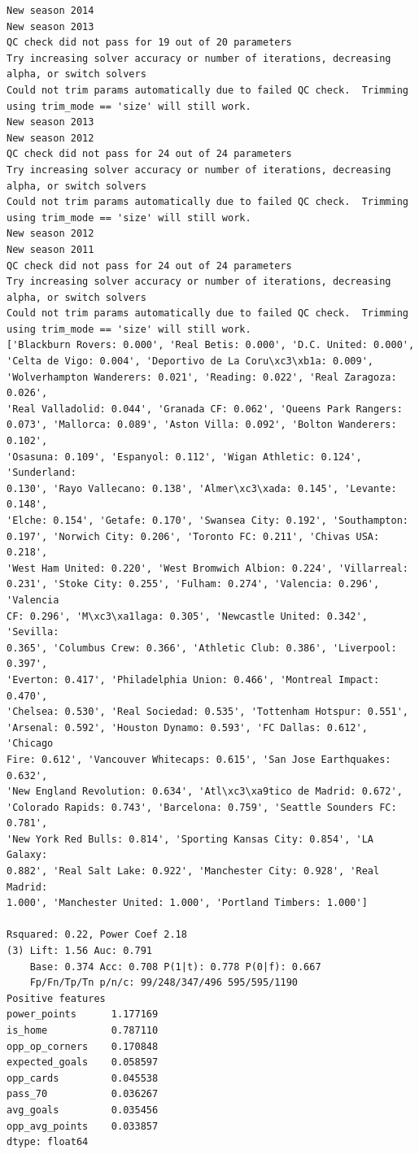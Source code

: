 \documentclass[12pt,fleqn]{article}\usepackage{common}
\begin{document}
\begin{verbatim}
New season 2014
New season 2013
QC check did not pass for 19 out of 20 parameters
Try increasing solver accuracy or number of iterations, decreasing alpha, or switch solvers
Could not trim params automatically due to failed QC check.  Trimming using trim_mode == 'size' will still work.
New season 2013
New season 2012
QC check did not pass for 24 out of 24 parameters
Try increasing solver accuracy or number of iterations, decreasing alpha, or switch solvers
Could not trim params automatically due to failed QC check.  Trimming using trim_mode == 'size' will still work.
New season 2012
New season 2011
QC check did not pass for 24 out of 24 parameters
Try increasing solver accuracy or number of iterations, decreasing alpha, or switch solvers
Could not trim params automatically due to failed QC check.  Trimming using trim_mode == 'size' will still work.
['Blackburn Rovers: 0.000', 'Real Betis: 0.000', 'D.C. United: 0.000',
'Celta de Vigo: 0.004', 'Deportivo de La Coru\xc3\xb1a: 0.009',
'Wolverhampton Wanderers: 0.021', 'Reading: 0.022', 'Real Zaragoza: 0.026',
'Real Valladolid: 0.044', 'Granada CF: 0.062', 'Queens Park Rangers:
0.073', 'Mallorca: 0.089', 'Aston Villa: 0.092', 'Bolton Wanderers: 0.102',
'Osasuna: 0.109', 'Espanyol: 0.112', 'Wigan Athletic: 0.124', 'Sunderland:
0.130', 'Rayo Vallecano: 0.138', 'Almer\xc3\xada: 0.145', 'Levante: 0.148',
'Elche: 0.154', 'Getafe: 0.170', 'Swansea City: 0.192', 'Southampton:
0.197', 'Norwich City: 0.206', 'Toronto FC: 0.211', 'Chivas USA: 0.218',
'West Ham United: 0.220', 'West Bromwich Albion: 0.224', 'Villarreal:
0.231', 'Stoke City: 0.255', 'Fulham: 0.274', 'Valencia: 0.296', 'Valencia
CF: 0.296', 'M\xc3\xa1laga: 0.305', 'Newcastle United: 0.342', 'Sevilla:
0.365', 'Columbus Crew: 0.366', 'Athletic Club: 0.386', 'Liverpool: 0.397',
'Everton: 0.417', 'Philadelphia Union: 0.466', 'Montreal Impact: 0.470',
'Chelsea: 0.530', 'Real Sociedad: 0.535', 'Tottenham Hotspur: 0.551',
'Arsenal: 0.592', 'Houston Dynamo: 0.593', 'FC Dallas: 0.612', 'Chicago
Fire: 0.612', 'Vancouver Whitecaps: 0.615', 'San Jose Earthquakes: 0.632',
'New England Revolution: 0.634', 'Atl\xc3\xa9tico de Madrid: 0.672',
'Colorado Rapids: 0.743', 'Barcelona: 0.759', 'Seattle Sounders FC: 0.781',
'New York Red Bulls: 0.814', 'Sporting Kansas City: 0.854', 'LA Galaxy:
0.882', 'Real Salt Lake: 0.922', 'Manchester City: 0.928', 'Real Madrid:
1.000', 'Manchester United: 1.000', 'Portland Timbers: 1.000'] 

Rsquared: 0.22, Power Coef 2.18
(3) Lift: 1.56 Auc: 0.791
    Base: 0.374 Acc: 0.708 P(1|t): 0.778 P(0|f): 0.667
    Fp/Fn/Tp/Tn p/n/c: 99/248/347/496 595/595/1190
Positive features
power_points      1.177169
is_home           0.787110
opp_op_corners    0.170848
expected_goals    0.058597
opp_cards         0.045538
pass_70           0.036267
avg_goals         0.035456
opp_avg_points    0.033857
dtype: float64


\end{verbatim}
\end{document}
